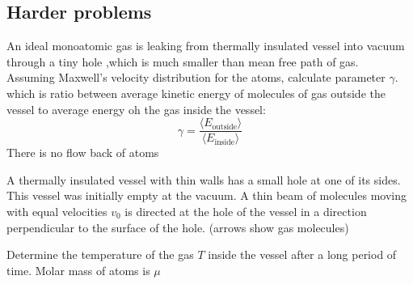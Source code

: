 \documentclass[a4paper, 12pt]{article}
\begin{document}
\subsection{Harder problems}
\begin{problem}
    An ideal monoatomic gas is leaking from thermally insulated vessel into vacuum through a tiny hole
    ,which is much smaller than mean free path of gas.\\
    Assuming Maxwell's velocity distribution for the atoms, calculate parameter $\gamma$. which is ratio 
    between average kinetic energy of molecules of gas outside the vessel to average energy oh the gas inside the 
    vessel: $$\gamma=\frac{\langle E_{\text{outside}}\rangle}{\langle E_{\text{inside}}\rangle}$$
    There is no flow back of atoms
\end{problem}
\begin{problem}
    A thermally insulated vessel with thin walls  has a small hole at one of its sides. This vessel was initially empty at the vacuum.
    A thin beam of molecules moving with equal velocities $v_0$  is directed at the hole of the vessel
    in a direction perpendicular to the surface of the hole.
    (arrows show gas molecules)
    \begin{center}
    \end{center}
    Determine the temperature of the gas $T$ inside the vessel after a long period of time. Molar mass of atoms is $\mu$
\end{problem}
\end{document}
